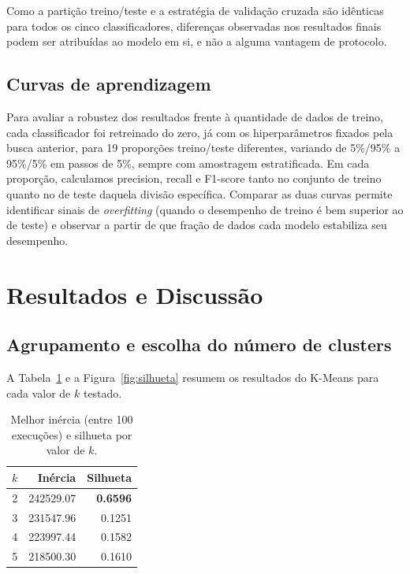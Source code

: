 \documentclass[a4paper,10pt]{article}
\begin{document}
Como a partição treino/teste e a estratégia de validação cruzada são idênticas para todos os cinco classificadores, diferenças observadas nos resultados finais podem ser atribuídas ao modelo em si, e não a alguma vantagem de protocolo.

\subsection{Curvas de aprendizagem}

Para avaliar a robustez dos resultados frente à quantidade de dados de treino, cada classificador foi retreinado do zero, já com os hiperparâmetros fixados pela busca anterior, para 19 proporções treino/teste diferentes, variando de 5\%/95\% a 95\%/5\% em passos de 5\%, sempre com amostragem estratificada. Em cada proporção, calculamos precision, recall e F1-score tanto no conjunto de treino quanto no de teste daquela divisão específica. Comparar as duas curvas permite identificar sinais de \textit{overfitting} (quando o desempenho de treino é bem superior ao de teste) e observar a partir de que fração de dados cada modelo estabiliza seu desempenho.

\section{Resultados e Discussão}

\subsection{Agrupamento e escolha do número de clusters}
\label{sec:agrupamento}

A Tabela~\ref{tab:kmeans} e a Figura~\ref{fig:silhueta} resumem os resultados do K-Means para cada valor de $k$ testado.

\begin{table}[H]
\centering
\caption{Melhor inércia (entre 100 execuções) e silhueta por valor de $k$.}
\label{tab:kmeans}
\begin{tabular}{@{}c r r@{}}
\toprule
$k$ & Inércia & Silhueta \\
\midrule
2 & 242529.07 & \textbf{0.6596} \\
3 & 231547.96 & 0.1251 \\
4 & 223997.44 & 0.1582 \\
5 & 218500.30 & 0.1610 \\
\bottomrule
\end{tabular}
\end{table}
\end{document}
